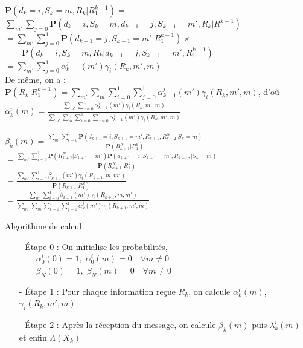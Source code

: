 \documentclass[11pt]{beamer}
\begin{document}
\begin{frame}
	$\mathbf{P}(d_k=i,S_k=m,R_k|R_1^{k-1})=$\\
	$\sum\limits_{m'}\sum\limits_{j=0}^1\mathbf{P}(d_k=i,S_k=m,d_{k-1}=j,S_{k-1}=m',R_k|R_1^{k-1})$\\
	$=\sum\limits_{m'}\sum\limits_{j=0}^1\mathbf{P}(d_{k-1}=j,S_{k-1}=m'|R_1^{k-1})\times$\\
	$\qquad\mathbf{P}(d_k=i,S_k=m,R_k|d_{k-1}=j,S_{k-1}=m',R_1^{k-1})$\\
	$=\sum\limits_{m'}\sum\limits_{j=0}^1\alpha_{k-1}^j(m')\gamma_i(R_k, m', m)$\\
	De m\^eme, on a :\\
	$\mathbf{P}(R_k|R_1^{k-1})=\sum\limits_{m'}\sum\limits_{m}\sum\limits_{i=0}^1\sum\limits_{j=0}^1\alpha_{k-1}^j(m')\gamma_i(R_k, m', m)$, d'o\`u\\
	$\alpha_k^i(m)=\frac{\sum\limits_{m'}\sum\limits_{j=0}^1\alpha_{k-1}^j(m')\gamma_i(R_k,m',m)}{\sum\limits_{m'}\sum\limits_{m}\sum\limits_{i=0}^1\sum\limits_{j=0}^1\alpha_{k-1}^j(m')\gamma_i(R_k, m', m)}$
\end{frame}

\begin{frame}
	$\beta_k(m)=\frac{\sum\limits_{m'}\sum\limits_{i=0}^1\mathbf{P}(d_{k+1}=i,S_{k+1}=m',R_{k+1},R_{k+2}^N|S_k=m)}{\mathbf{P}(R_{k+1}^N|R_1^k)}$\\
	$=\frac{\sum\limits_{m'}\sum\limits_{i=0}^1\mathbf{P}(R_{k+2}^N|S_{k+1}=m')\mathbf{P}(d_{k+1}=i,S_{k+1}=m',R_{k+1},|S_k=m)}{\mathbf{P}(R_{k+1}^N|R_1^k)}$\\
	$=\frac{\sum\limits_{m'}\sum\limits_{i=0}^1\beta_{k+1}(m')\gamma_i(R_{k+1},m,m')}{\mathbf{P}(R_{k+1}|R_1^k)}$\\
	$=\frac{\sum\limits_{m'}\sum\limits_{i=0}^1\beta_{k+1}(m')\gamma_i(R_{k+1},m,m')}{\sum\limits_{m'}\sum\limits_{m}\sum\limits_{i=0}^1\sum\limits_{j=0}^1\alpha_{k}^j(m')\gamma_i(R_{k+1}, m', m)}$
\end{frame}

\begin{frame}
	
\end{frame}

\begin{frame}{Algorithme de calcul}
	\begin{itemize}
		\item[-] \'Etape 0 : On initialise les probabilit\'es, \\
					$\qquad \alpha_0^i(0) = 1, \; \alpha_0^i(m) = 0 \quad \forall m \neq 0$\\
					$\qquad \beta_N(0) = 1, \; \beta_N(m) = 0 \quad \forall m \neq 0$
		\item[-] \'Etape 1 : Pour chaque information re\c{c}ue $R_k$, on calcule $\alpha_k^i(m)$, $\gamma_i(R_k, m', m)$
		\item[-] \'Etape 2 : Apr\`es la r\'eception du message, on calcule  $\beta_k(m)$ puis  $\lambda_k^i(m)$ et enfin $\Lambda(X_k)$
	\end{itemize}
\end{frame}
\end{document}
